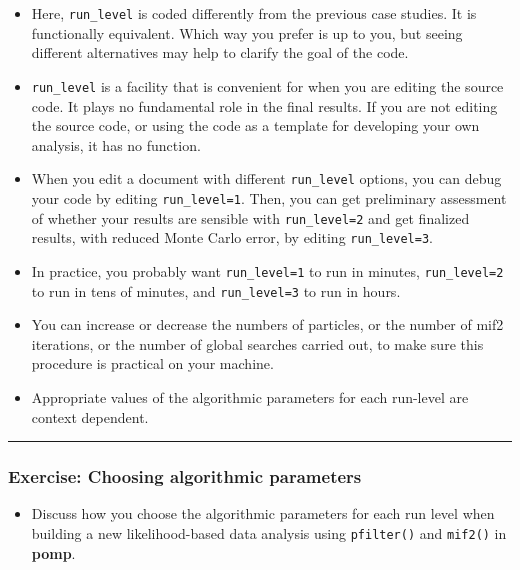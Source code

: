 \documentclass[]{article}
\providecommand{\tightlist}{%
  \setlength{\itemsep}{0pt}\setlength{\parskip}{0pt}}
\begin{document}
\begin{itemize}
\item
  Here, \texttt{run\_level} is coded differently from the previous case
  studies. It is functionally equivalent. Which way you prefer is up to
  you, but seeing different alternatives may help to clarify the goal of
  the code.
\item
  \texttt{run\_level} is a facility that is convenient for when you are
  editing the source code. It plays no fundamental role in the final
  results. If you are not editing the source code, or using the code as
  a template for developing your own analysis, it has no function.
\item
  When you edit a document with different \texttt{run\_level} options,
  you can debug your code by editing \texttt{run\_level=1}. Then, you
  can get preliminary assessment of whether your results are sensible
  with \texttt{run\_level=2} and get finalized results, with reduced
  Monte Carlo error, by editing \texttt{run\_level=3}.
\item
  In practice, you probably want \texttt{run\_level=1} to run in
  minutes, \texttt{run\_level=2} to run in tens of minutes, and
  \texttt{run\_level=3} to run in hours.
\item
  You can increase or decrease the numbers of particles, or the number
  of mif2 iterations, or the number of global searches carried out, to
  make sure this procedure is practical on your machine.
\item
  Appropriate values of the algorithmic parameters for each run-level
  are context dependent.
\end{itemize}

\begin{center}\rule{0.5\linewidth}{\linethickness}\end{center}

\subsubsection{Exercise: Choosing algorithmic
parameters}\label{exercise-choosing-algorithmic-parameters}

\begin{itemize}
\tightlist
\item
  Discuss how you choose the algorithmic parameters for each run level
  when building a new likelihood-based data analysis using
  \texttt{pfilter()} and \texttt{mif2()} in \textbf{pomp}.
\end{itemize}
\end{document}
